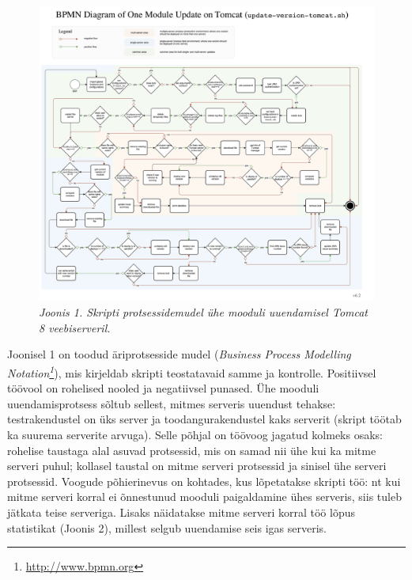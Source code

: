 \documentclass[12pt]{article}
\begin{document}
   \begin{figure}[H]
     \begin{center}
       \includegraphics[width=.8\textwidth]{diagrams/BPMN-diagram-one-module-tomcat.png}
       \caption*{\textit{Joonis 1. Skripti protsessidemudel ühe mooduli uuendamisel Tomcat 8 veebiserveril.}}
     \end{center}
   \end{figure}
   
   \newpage
   
   Joonisel 1 on toodud äriprotsesside mudel (\textit{Business Process Modelling Notation\footnote{\url{http://www.bpmn.org}}}), mis kirjeldab skripti teostatavaid samme ja kontrolle. Positiivsel töövool on rohelised nooled ja negatiivsel punased. Ühe mooduli uuendamisprotsess sõltub sellest, mitmes serveris uuendust tehakse: testrakendustel on üks server ja toodangurakendustel kaks serverit (skript töötab ka suurema serverite arvuga). Selle põhjal on töövoog jagatud kolmeks osaks: rohelise taustaga alal asuvad protsessid, mis on samad nii ühe kui ka mitme serveri puhul; kollasel taustal on mitme serveri protsessid ja sinisel ühe serveri protsessid. Voogude põhierinevus on kohtades, kus lõpetatakse skripti töö: nt kui mitme serveri korral ei õnnestunud mooduli paigaldamine ühes serveris, siis tuleb jätkata teise serveriga. Lisaks näidatakse mitme serveri korral töö lõpus statistikat (Joonis 2), millest selgub uuendamise seis igas serveris.
   
\end{document}
